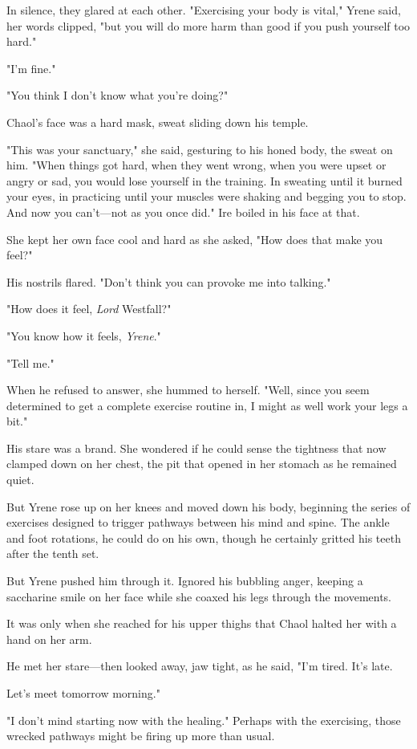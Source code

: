 In silence, they glared at each other.
"Exercising your body is vital," Yrene said, her words clipped, "but you will do more harm than good if you push yourself too hard."

"I'm fine."

"You think I don't know what you're doing?"

Chaol's face was a hard mask, sweat sliding down his temple.

"This was your sanctuary," she said, gesturing to his honed body, the sweat on him.
"When things got hard, when they went wrong, when you were upset or angry or sad, you would lose yourself in the training.
In sweating until it burned your eyes, in practicing until your muscles were shaking and begging you to stop.
And now you can't---not as you once did."
Ire boiled in his face at that.

She kept her own face cool and hard as she asked, "How does that make you feel?"

His nostrils flared.
"Don't think you can provoke me into talking."

"How does it feel, \emph{Lord} Westfall?"

"You know how it feels, \emph{Yrene}."

"Tell me."

When he refused to answer, she hummed to herself.
"Well, since you seem determined to get a complete exercise routine in, I might as well work your legs a bit."

His stare was a brand.
She wondered if he could sense the tightness that now clamped down on her chest, the pit that opened in her stomach as he remained quiet.

But Yrene rose up on her knees and moved down his body, beginning the series of exercises designed to trigger pathways between his mind and spine.
The ankle and foot rotations, he could do on his own, though he certainly gritted his teeth after the tenth set.

But Yrene pushed him through it.
Ignored his bubbling anger, keeping a saccharine smile on her face while she coaxed his legs through the movements.

It was only when she reached for his upper thighs that Chaol halted her with a hand on her arm.

He met her stare---then looked away, jaw tight, as he said, "I'm tired.
It's late.

Let's meet tomorrow morning."

"I don't mind starting now with the healing."
Perhaps with the exercising, those wrecked pathways might be firing up more than usual.

